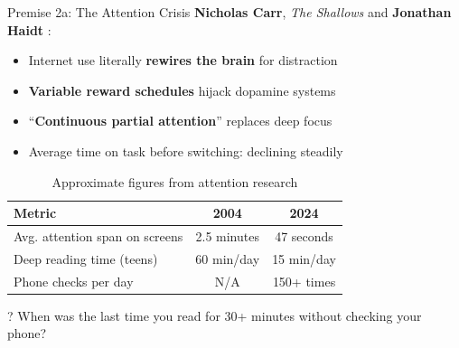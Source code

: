\documentclass[aspectratio=169]{beamer}
\begin{document}
\begin{frame}{Premise 2a: The Attention Crisis}
\textbf{Nicholas Carr}, \textit{The Shallows} \parencite{carr_shallows} and \textbf{Jonathan Haidt} \parencite{haidt_anxious_generation}:

\begin{itemize}
    \item Internet use literally \textbf{rewires the brain} for distraction
    \item \textbf{Variable reward schedules} hijack dopamine systems
    \item ``\textbf{Continuous partial attention}'' replaces deep focus
    \item Average time on task before switching: declining steadily
\end{itemize}

\vspace{0.3cm}
\begin{table}[h]
\centering
\small
\begin{tabular}{l c c}
\toprule
\textbf{Metric} & \textbf{2004} & \textbf{2024} \\
\midrule
Avg. attention span on screens & 2.5 minutes & 47 seconds \\
Deep reading time (teens) & 60 min/day & 15 min/day \\
Phone checks per day & N/A & 150+ times \\
\bottomrule
\end{tabular}
\caption{\small Approximate figures from attention research}
\end{table}

\begin{alertblock}{?}
When was the last time you read for 30+ minutes without checking your phone?
\end{alertblock}
\end{frame}
\end{document}
